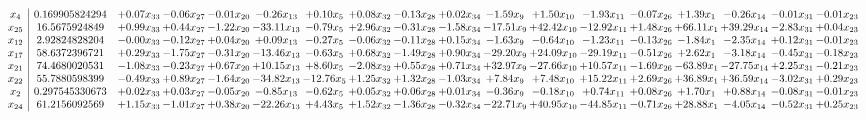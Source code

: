 \documentclass[9pt]{article}
\begin{document}
 \[\begin{array}{c| c c@{\hskip 2pt} c@{\hskip 2pt} c@{\hskip 2pt} c@{\hskip 2pt} c@{\hskip 2pt} c@{\hskip 2pt} c@{\hskip 2pt} c@{\hskip 2pt} c@{\hskip 2pt} c@{\hskip 2pt} c@{\hskip 2pt} c@{\hskip 2pt} c@{\hskip 2pt} c@{\hskip 2pt} c@{\hskip 2pt} c@{\hskip 2pt} }
 x_{4}   &  0.169905824294 & +  0.07 x_{33} & -0.06 x_{27} & -0.01 x_{20} & -0.26 x_{13} & +  0.10 x_{5} & +  0.08 x_{32} & -0.13 x_{28} & +  0.02 x_{34} & -1.59 x_{9} & +  1.50 x_{10} & -1.93 x_{11} & -0.07 x_{26} & +  1.39 x_{1} & -0.26 x_{14} & -0.01 x_{31} & -0.01 x_{23}\\
 x_{25}   &  16.5675924849 & +  0.99 x_{33} & +  0.44 x_{27} & -1.22 x_{20} & -33.11 x_{13} & -0.79 x_{5} & +  2.96 x_{32} & -0.31 x_{28} & -1.58 x_{34} & -17.51 x_{9} & + 42.42 x_{10} & -12.92 x_{11} & +  1.48 x_{26} & + 66.11 x_{1} & + 39.29 x_{14} & -2.83 x_{31} & +  0.04 x_{23}\\
 x_{12}   &  2.92824828204 & -0.00 x_{33} & -0.12 x_{27} & +  0.04 x_{20} & +  0.09 x_{13} & -0.27 x_{5} & -0.06 x_{32} & -0.11 x_{28} & +  0.15 x_{34} & -1.63 x_{9} & -0.64 x_{10} & -1.23 x_{11} & -0.13 x_{26} & -1.84 x_{1} & -2.35 x_{14} & +  0.12 x_{31} & -0.01 x_{23}\\
 x_{17}   &  58.6372396721 & +  0.29 x_{33} & -1.75 x_{27} & -0.31 x_{20} & -13.46 x_{13} & -0.63 x_{5} & +  0.68 x_{32} & -1.49 x_{28} & +  0.90 x_{34} & -29.20 x_{9} & + 24.09 x_{10} & -29.19 x_{11} & -0.51 x_{26} & +  2.62 x_{1} & -3.18 x_{14} & -0.45 x_{31} & -0.18 x_{23}\\
 x_{21}   &  74.4680020531 & -1.08 x_{33} & -0.23 x_{27} & +  0.67 x_{20} & + 10.15 x_{13} & +  8.60 x_{5} & -2.08 x_{32} & +  0.55 x_{28} & +  0.71 x_{34} & + 32.97 x_{9} & -27.66 x_{10} & + 10.57 x_{11} & -1.69 x_{26} & -63.89 x_{1} & -27.75 x_{14} & +  2.25 x_{31} & -0.21 x_{23}\\
 x_{22}   &  55.7880598399 & -0.49 x_{33} & +  0.89 x_{27} & -1.64 x_{20} & -34.82 x_{13} & -12.76 x_{5} & +  1.25 x_{32} & +  1.32 x_{28} & -1.03 x_{34} & +  7.84 x_{9} & +  7.48 x_{10} & + 15.22 x_{11} & +  2.69 x_{26} & + 36.89 x_{1} & + 36.59 x_{14} & -3.02 x_{31} & +  0.29 x_{23}\\
 x_{2}   &  0.297545330673 & +  0.02 x_{33} & +  0.03 x_{27} & -0.05 x_{20} & -0.85 x_{13} & -0.62 x_{5} & +  0.05 x_{32} & +  0.06 x_{28} & +  0.01 x_{34} & -0.36 x_{9} & -0.18 x_{10} & +  0.74 x_{11} & +  0.08 x_{26} & +  1.70 x_{1} & +  0.88 x_{14} & -0.08 x_{31} & -0.01 x_{23}\\
 x_{24}   &  61.2156092569 & +  1.15 x_{33} & -1.01 x_{27} & +  0.38 x_{20} & -22.26 x_{13} & +  4.43 x_{5} & +  1.52 x_{32} & -1.36 x_{28} & -0.32 x_{34} & -22.71 x_{9} & + 40.95 x_{10} & -44.85 x_{11} & -0.71 x_{26} & + 28.88 x_{1} & -4.05 x_{14} & -0.52 x_{31} & +  0.25 x_{23}\\

\end{array}\]
\end{document}
